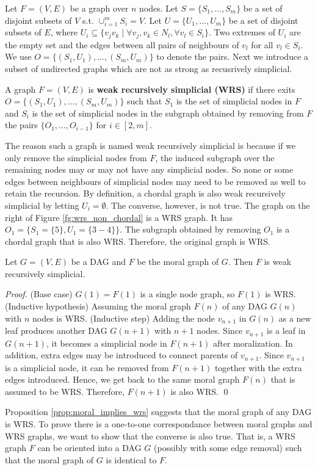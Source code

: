 Let $F=(V,E)$ be a graph over $n$ nodes. Let $S=\{S_1, \dots, S_m\}$ be a set of disjoint subsets of $V$ s.t. $\cup_{i=1}^m S_i=V$. Let $U=\{U_1, \dots, U_m\}$ be a set of disjoint subsets of $E$, where $U_i \subseteq \{v_jv_k \mid \forall v_j, v_k \in N_l, \forall v_l \in S_i\}$. Two extremes of $U_i$ are the empty set and the edges between all pairs of neighbours of $v_l$ for all $v_l \in S_i$. We use $O = \{(S_1, U_1), \dots, (S_m, U_m)\}$ to denote the pairs. Next we introduce a subset of undirected graphs which are not as strong as recusrively simplicial.  

\begin{definition}
\label{def:wrs}
A graph $F=(V,E)$ is \textbf{weak recursively simplicial (WRS)} if there exits $O = \{(S_1, U_1), \dots, (S_m, U_m)\}$ such that $S_1$ is the set of simplicial nodes in $F$ and $S_{i}$ is the set of simplicial nodes in the subgraph obtained by removing from $F$ the pairs $\{O_1, \dots, O_{i-1}\}$ for $i \in [2,m]$. 
\end{definition}
The reason such a graph is named weak recursively simplicial is because if we only remove the simplicial nodes from $F$, the induced subgraph over the remaining nodes may or may not have any simplicial nodes. So none or some edges between neighbours of simplicial nodes may need to be removed as well to retain the recursion. By definition, a chordal graph is also weak recursively simplicial by letting $U_i=\emptyset$. The converse, however, is not true. The graph on the right of Figure \ref{fg:wrs_non_chordal} is a WRS graph. It has $O_1 = \{S_1=\{5\}, U_1=\{3-4\}\}$. The subgraph obtained by removing $O_1$ is a chordal graph that is also WRS. Therefore, the original graph is WRS.  

\begin{proposition}
\label{prop:moral_implies_wrs}
Let $G=(V,E)$ be a DAG and $F$ be the moral graph of $G$. Then $F$ is weak recursively simplicial. 
\end{proposition}

\begin{proof}
(Base case) $G(1) = F(1)$ is a single node graph, so $F(1)$ is WRS. (Inductive hypothesis) Assuming the moral graph $F(n)$ of any DAG $G(n)$ with $n$ nodes is WRS. (Inductive step) Adding the node $v_{n+1}$ in $G(n)$ as a new leaf produces another DAG $G(n+1)$ with $n+1$ nodes. Since $v_{n+1}$ is a leaf in $G(n+1)$, it becomes a simplicial node in $F(n+1)$ after moralization. In addition, extra edges may be introduced to connect parents of $v_{n+1}$. Since $v_{n+1}$ is a simplicial node, it can be removed from $F(n+1)$ together with the extra edges introduced. Hence, we get back to the same moral graph $F(n)$ that is assumed to be WRS. Therefore, $F(n+1)$ is also WRS. \qed
\end{proof}
Proposition \ref{prop:moral_implies_wrs} suggests that the moral graph of any DAG is WRS. To prove there is a one-to-one correspondance between moral graphs and WRS graphs, we want to show that the converse is also true. That is, a WRS graph $F$ can be oriented into a DAG $G$ (possibly with some edge removal) such that the moral graph of $G$ is identical to $F$. 

